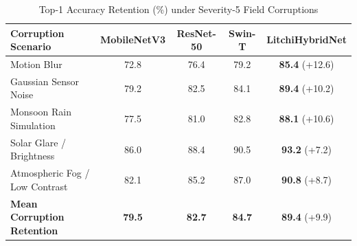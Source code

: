 \begin{table}[t]
\centering
\caption{Top-1 Accuracy Retention (\%) under Severity-5 Field Corruptions}
\label{tab:robustness}
\begin{tabular}{lcccc}
\toprule
\textbf{Corruption Scenario} & \textbf{MobileNetV3} & \textbf{ResNet-50} & \textbf{Swin-T} & \textbf{LitchiHybridNet} \\
\midrule
Motion Blur & 72.8 & 76.4 & 79.2 & \textbf{85.4} (+12.6) \\
Gaussian Sensor Noise & 79.2 & 82.5 & 84.1 & \textbf{89.4} (+10.2) \\
Monsoon Rain Simulation & 77.5 & 81.0 & 82.8 & \textbf{88.1} (+10.6) \\
Solar Glare / Brightness & 86.0 & 88.4 & 90.5 & \textbf{93.2} (+7.2) \\
Atmospheric Fog / Low Contrast & 82.1 & 85.2 & 87.0 & \textbf{90.8} (+8.7) \\
\midrule
\textbf{Mean Corruption Retention} & \textbf{79.5} & \textbf{82.7} & \textbf{84.7} & \textbf{89.4} (+9.9) \\
\bottomrule
\end{tabular}
\end{table}
